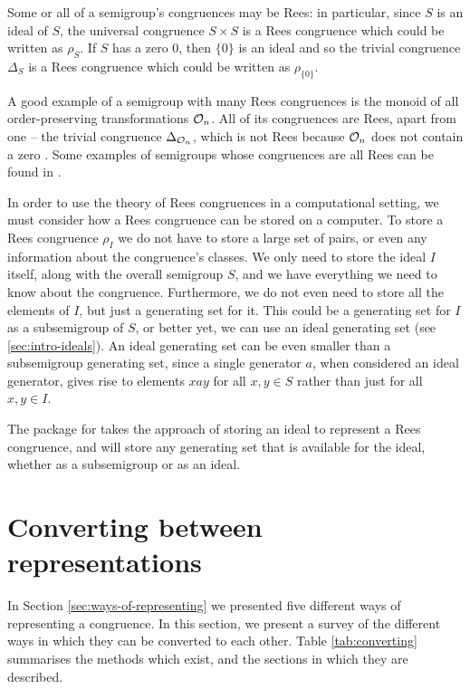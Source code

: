Some or all of a semigroup's congruences may be Rees: in particular, since $S$
is an ideal of $S$, the universal congruence $S \times S$ is a Rees congruence
which could be written as $\rho_S$.  If $S$ has a zero $0$, then $\{0\}$ is an
ideal and so the trivial congruence $\Delta_S$ is a Rees congruence which could
be written as $\rho_{\{0\}}$.

A good example of a semigroup with many Rees congruences is the monoid of all
order-preserving transformations $\mathcal{O}_n$.  All of its congruences are Rees,
apart from one -- the trivial congruence $\Delta_{\mathcal{O}_n}$, which is not Rees
because $\mathcal{O}_n$ does not contain a zero \cite{lavers_1999}.
Some examples of semigroups whose congruences are all Rees can be found in
\cite[\S 5]{garcia_1991}.

In order to use the theory of Rees congruences in a computational setting, we
must consider how a Rees congruence can be stored on a computer.  To store a
Rees congruence $\rho_I$ we do not have to store a large set of pairs, or even
any information about the congruence's classes.  We only need to store the ideal
$I$ itself, along with the overall semigroup $S$, and we have everything we need
to know about the congruence.  Furthermore, we do not even need to store all the
elements of $I$, but just a generating set for it.  This could be a generating
set for $I$ as a subsemigroup of $S$, or better yet, we can use an ideal
generating set (see \ref{sec:intro-ideals}).  An ideal generating set can be
even smaller than a subsemigroup generating set, since a single generator $a$,
when considered an ideal generator, gives rise to elements $xay$ for all
$x,y \in S$ rather than just for all $x,y \in I$.

The \Semigroups{} package for \GAP{} takes the approach of storing an ideal to
represent a Rees congruence, and will store any generating set that is available
for the ideal, whether as a subsemigroup or as an ideal.

\section{Converting between representations}
\label{sec:converting}

In Section \ref{sec:ways-of-representing} we presented five different ways of
representing a congruence.  In this section, we present a survey of the
different ways in which they can be converted to each other.  Table
\ref{tab:converting} summarises the methods which exist, and the sections in
which they are described.

